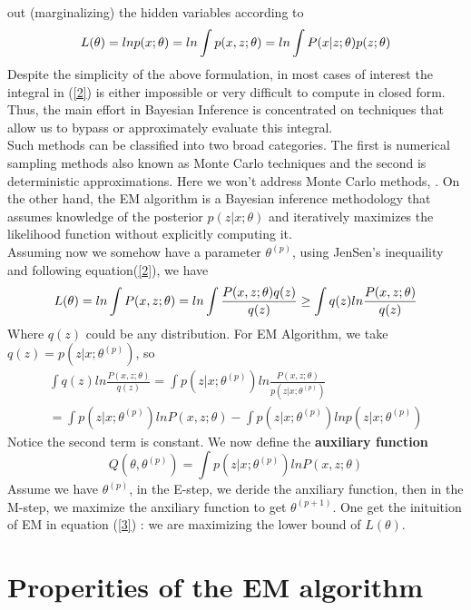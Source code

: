 \documentclass[11pt]{article}
\begin{document}
out (marginalizing) the hidden variables according to
\begin{equation}{\label{2}}
L(\theta) = lnp(x;\theta) = ln \int p(x,z;\theta) = ln \int P(x|z;\theta)p(z;\theta) 
\end{equation}
Despite the simplicity of the above formulation, in most cases of interest the integral in (\ref{2}) is either impossible or very difficult to compute in closed form. Thus, the main effort in Bayesian Inference is concentrated on techniques that allow us to bypass or approximately evaluate this integral.  \\
Such methods can be classified into two broad categories\cite{LifeAfter}. The first is numerical sampling methods also known as Monte Carlo techniques and the second is deterministic approximations. Here we won't address Monte Carlo methods\cite{2003MC}, \cite{MCMC}. On the other hand, the EM algorithm is a Bayesian inference methodology that assumes knowledge of the posterior $p(z|x;\theta)$ and iteratively maximizes the likelihood function without explicitly computing it.\\
Assuming now we somehow have a parameter $\theta^{(p)}$, using JenSen's inequaility and following equation(\ref{2}), we have
\begin{equation}{\label{3}}
L(\theta) = ln \int P(x, z;\theta) = ln \int \frac{P(x, z;\theta)q(z)}{q(z)}
\geq \int q(z) ln\frac{P(x,z;\theta)}{q(z)}
\end{equation}
Where $q(z)$ could be any distribution. For EM Algorithm, we take $q(z) = p(z|x; \theta^{(p)})$, so
\begin{equation}
\begin{split}
\int q(z) ln\frac{P(x,z;\theta)}{q(z)} = \int p(z|x; \theta^{(p)}) ln\frac{P(x,z;\theta)}{p(z|x; \theta^{(p)})} \\ 
= \int p(z|x; \theta^{(p)}) lnP(x,z;\theta) - \int p(z|x; \theta^{(p)})lnp(z|x; \theta^{(p)})
\end{split}
\end{equation}
Notice the second term is constant. We now define the \textbf{auxiliary function}
\begin{equation}
Q(\theta, \theta^{(p)}) = \int p(z|x; \theta^{(p)}) lnP(x,z;\theta)
\end{equation}
Assume we have $\theta^{(p)}$, in the E-step, we deride the anxiliary function, then in the M-step, we maximize the anxiliary function to get $\theta^{(p+1)}$. One get the inituition of EM in equation (\ref{3}) : we are maximizing the lower bound of $L(\theta)$.
\section{Properities of the EM algorithm}
\end{document}
